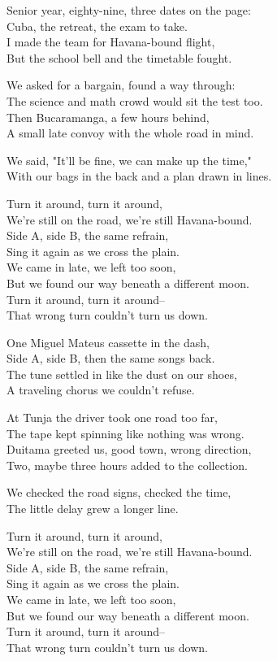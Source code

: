 \begin{lyrics}
Senior year, eighty-nine, three dates on the page:\\
Cuba, the retreat, the exam to take.\\
I made the team for Havana-bound flight,\\
But the school bell and the timetable fought.

We asked for a bargain, found a way through:\\
The science and math crowd would sit the test too.\\
Then Bucaramanga, a few hours behind,\\
A small late convoy with the whole road in mind.

We said, "It'll be fine, we can make up the time,"\\
With our bags in the back and a plan drawn in lines.

Turn it around, turn it around,\\
We're still on the road, we're still Havana-bound.\\
Side A, side B, the same refrain,\\
Sing it again as we cross the plain.\\
We came in late, we left too soon,\\
But we found our way beneath a different moon.\\
Turn it around, turn it around--\\
That wrong turn couldn't turn us down.

One Miguel Mateus cassette in the dash,\\
Side A, side B, then the same songs back.\\
The tune settled in like the dust on our shoes,\\
A traveling chorus we couldn't refuse.

At Tunja the driver took one road too far,\\
The tape kept spinning like nothing was wrong.\\
Duitama greeted us, good town, wrong direction,\\
Two, maybe three hours added to the collection.

We checked the road signs, checked the time,\\
The little delay grew a longer line.

Turn it around, turn it around,\\
We're still on the road, we're still Havana-bound.\\
Side A, side B, the same refrain,\\
Sing it again as we cross the plain.\\
We came in late, we left too soon,\\
But we found our way beneath a different moon.\\
Turn it around, turn it around--\\
That wrong turn couldn't turn us down.


\end{lyrics}
